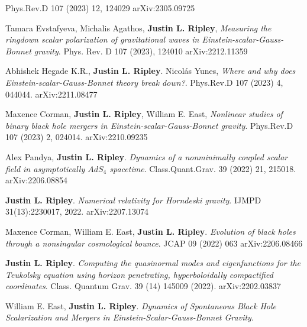 \documentclass{my_cv}
\begin{document}
\begin{etaremune}
    Phys.Rev.D 107 (2023) 12, 124029 
    arXiv:2305.09725
\item Tamara Evstafyeva, Michalis Agathos, {\bf Justin L. Ripley}, 
    \emph{Measuring the ringdown scalar polarization of gravitational waves in 
    Einstein-scalar-Gauss-Bonnet gravity}.
    Phys. Rev. D 107 (2023), 124010
    arXiv:2212.11359
\item Abhishek Hegade K.R., {\bf Justin L. Ripley}. Nicol\'{a}s Yunes, 
    \emph{Where and why does Einstein-scalar-Gauss-Bonnet theory break down?}.
    Phys.Rev.D 107 (2023) 4, 044044.
    arXiv:2211.08477
\item Maxence Corman, {\bf Justin L. Ripley}, William E. East, 
   \emph{Nonlinear studies of binary black hole mergers in 
   Einstein-scalar-Gauss-Bonnet gravity}.
   Phys.Rev.D 107 (2023) 2, 024014. 
   arXiv:2210.09235
\item Alex Pandya, {\bf Justin L. Ripley}. 
   \emph{Dynamics of a nonminimally coupled scalar field in asymptotically
   $AdS_4$ spacetime}.
   Class.Quant.Grav. 39 (2022) 21, 215018.
   arXiv:2206.08854
\item {\bf Justin L. Ripley}. 
   \emph{Numerical relativity for Horndeski gravity}.
   IJMPD 31(13):2230017, 2022.
   arXiv:2207.13074 
\item Maxence Corman, William E. East, {\bf Justin L. Ripley}. 
   \emph{Evolution of black holes through a nonsingular cosmological bounce}.
   JCAP 09 (2022) 063
   arXiv:2206.08466
\item {\bf Justin L. Ripley}. 
   \emph{Computing the quasinormal modes and eigenfunctions for the 
   Teukolsky equation using horizon penetrating, 
   hyperboloidally compactified coordinates}.
   Class. Quantum Grav. 39 (14) 145009 (2022).
   arXiv:2202.03837
\item William E. East, {\bf Justin L. Ripley}. 
   \emph{Dynamics of Spontaneous Black Hole Scalarization and Mergers
   in Einstein-Scalar-Gauss-Bonnet Gravity}.

\end{etaremune}
\end{document}
